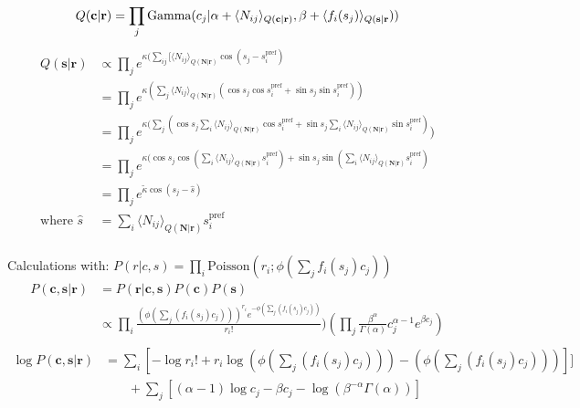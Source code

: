 \documentclass[12pt]{article}
\begin{document}
\begin{equation}
Q(\mathbf{c|r}) = \prod_j \text{Gamma} (c_j|\alpha + \langle N_{ij} \rangle_{Q(\mathbf{c|r})}, \beta + \langle f_i (s_j)\rangle_{Q(\mathbf{s|r}}))\\
\end{equation}
\begin{equation}
\begin{aligned}
Q(\mathbf{s|r}) &\propto \prod_j e^{\kappa(\sum_{ij} [\langle N_{ij} \rangle_{Q(\mathbf{N|r})} \cos(s_j - s_i^{\text{pref}})}\\
&= \prod_j e^{\kappa(\sum_{j} \langle N_{ij} \rangle_{Q(\mathbf{N|r})} (\cos s_j \cos s_i^{\text{pref}} + \sin s_j \sin s_i^{\text{pref}}))}\\
&= \prod_j e^{\kappa(\sum_j (\cos s_j \sum_i \langle N_{ij} \rangle_{Q(\mathbf{N|r})} \cos s_i^{\text{pref}} + \sin s_j \sum_i \langle N_{ij} \rangle_{Q(\mathbf{N|r})} \sin s_i^{\text{pref}})})\\
&= \prod_j e^{\kappa(\cos s_j \cos(\sum_i \langle N_{ij} \rangle_{Q(\mathbf{N|r})} s_i^{\text{pref}}) + \sin s_j \sin(\sum_i \langle N_{ij} \rangle_{Q(\mathbf{N|r})} s_i^{\text{pref}})}\\
&= \prod_j e^{\tilde{\kappa} \cos(s_j - \hat{s})}\\
\text{where } \hat{s} &= \sum_i \langle N_{ij} \rangle_{Q(\mathbf{N|r})} s_i^{\text{pref}}
\end{aligned}
\end{equation}
\\
Calculations with:
$P(r|c, s) = \prod_i \text{Poisson}(r_i; \phi(\sum_j f_i(s_j)c_j))$\\
\begin{equation}
\begin{aligned}
P(\mathbf{c, s|r}) & = P(\mathbf{r|c, s}) P(\mathbf{c}) P(\mathbf{s})\\
&\propto \prod_i\frac{(\phi(\sum_j(f_i(s_j)c_j)))^{r_i} e^{-\phi(\sum_j(f_i(s_j)c_j))}}{r_i!}) (\prod_j \frac{\beta^{\alpha}}{\Gamma(\alpha)} c_j^{\alpha - 1}e^{\beta c_j})\\
\end{aligned}
\end{equation}
\begin{equation}
\begin{aligned}
\log P(\mathbf{c, s| r}) &= \sum_i [- \log r_i! + r_i \log(\phi(\sum_j(f_i(s_j)c_j))) - (\phi(\sum_j(f_i(s_j)c_j)))]]\\
& \phantom{{}=1} + \sum_j[(\alpha - 1) \log c_j - \beta c_j - \log (\beta^{- \alpha} \Gamma (\alpha))]\\
\end{aligned}
\end{equation}
\end{document}
